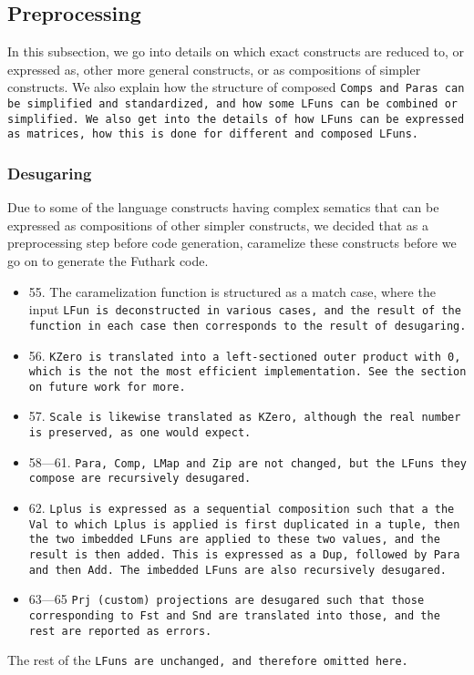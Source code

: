 \subsection{Preprocessing}
In this subsection, we go into details on which exact constructs are reduced to,
or expressed as, other more general constructs, or as compositions of simpler
constructs. We also explain how the structure of composed \tt{Comp}s and \tt{Para}s
can be simplified and standardized, and how some \tt{LFun}s can be combined or
simplified. We also get into the details of how \tt{LFun}s can be expressed as
matrices, how this is done for different and composed \tt{LFun}s.
\subsubsection{Desugaring}
Due to some of the language constructs having complex sematics that can be expressed
as compositions of other simpler constructs, we decided that as a preprocessing step
before code generation, caramelize these constructs before we go on to generate the
Futhark code.
\begin{itemize}
	\item 55. The caramelization function is structured as a match case, where the input \tt{LFun} is deconstructed in various cases, and the result of the function in each case then corresponds to the result of desugaring.
	\item 56. \tt{KZero} is translated into a left-sectioned outer product with 0, which is the not the most efficient implementation. See the section on future work for more.
	\item 57. \tt{Scale} is likewise translated as \tt{KZero}, although the real number is preserved, as one would expect.
	\item 58---61. \tt{Para}, \tt{Comp}, \tt{LMap} and \tt{Zip} are not changed, but the \tt{LFun}s they compose are recursively desugared.
	\item 62. \tt{Lplus} is expressed as a sequential composition such that a the \tt{Val} to which \tt{Lplus} is applied is first duplicated in a tuple, then the two imbedded \tt{LFun}s are applied to these two values, and the result is then added. This is expressed as a \tt{Dup}, followed by \tt{Para} and then \tt{Add}. The imbedded \tt{LFun}s are also recursively desugared.
	\item 63---65 \tt{Prj} (custom) projections are desugared such that those corresponding to \tt{Fst} and \tt{Snd} are translated into those, and the rest are reported as errors.
\end{itemize}
The rest of the \tt{LFun}s are unchanged, and therefore omitted here.
